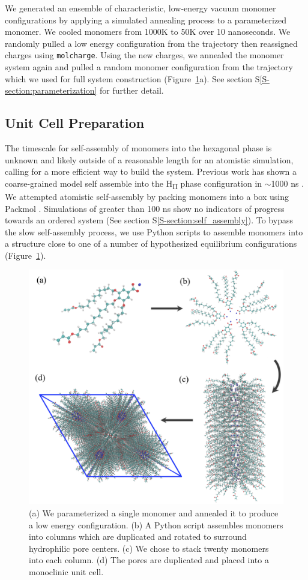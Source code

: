\documentclass[journal=jpcbfk,manuscript=article]{achemso}
\begin{document}
  We generated an ensemble of characteristic, low-energy vacuum monomer
  configurations by applying a simulated annealing process to a
  parameterized monomer. We cooled monomers from 1000K to 50K over 10
  nanoseconds. We randomly pulled a low energy configuration from the
  trajectory then reassigned charges using \texttt{molcharge}. Using the new
  charges, we annealed the monomer system again and pulled a random monomer
  configuration from the trajectory which we used for full system
  construction (Figure~\ref{fig:python}a). See section S\ref{S-section:parameterization} 
  for further detail.

  \subsection{Unit Cell Preparation}

  The timescale for self-assembly of monomers into the hexagonal phase is
  unknown and likely outside of a reasonable length for an atomistic simulation,
  calling for a more efficient way to build the system. Previous work has shown
  a coarse-grained model self assemble into the H\textsubscript{II} phase
  configuration in $\sim$1000 ns \cite{mondal_self-assembly_2013}.  We
  attempted atomistic self-assembly by packing monomers into a box using Packmol
  \cite{martinez_packmol:_2009}. Simulations of greater than 100 ns show no
  indicators of progress towards an ordered system (See section S\ref{S-section:self_assembly}). 
  To bypass the slow self-assembly process, we use Python scripts to assemble monomers
  into a structure close to one of a number of hypothesized equilibrium configurations
  (Figure~\ref{fig:python}).
  
  \begin{figure}
	\centering
	\includegraphics[width=0.75\linewidth]{build.PNG} %
	\caption{(a) We parameterized a single monomer and annealed it to produce a low energy
		configuration. (b) A Python script assembles monomers into columns which are duplicated 
		and rotated to surround hydrophilic pore centers. (c) We chose to stack twenty monomers
		into each column. (d) The pores are duplicated and placed into a monoclinic unit cell.}\label{fig:python}
  \end{figure}
  
\end{document}
